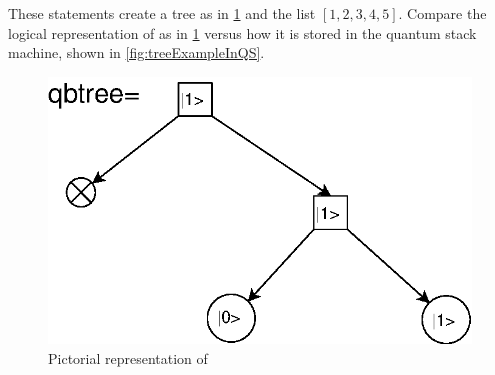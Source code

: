 These statements create a tree as in \ref{fig:treeExample} and
the list $[1,2,3,4,5]$. Compare the logical representation of
 as in \ref{fig:treeExample} versus how it is stored
in the quantum stack machine, shown in \vref{fig:treeExampleInQS}.
\begin{figure}[htbp]
\begin{center}
\includegraphics[scale=.6]{images/treeExample.eps}
\end{center}
\caption{Pictorial representation of }\label{fig:treeExample}
\end{figure}
